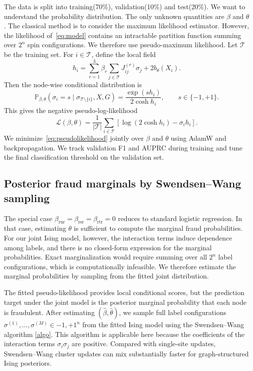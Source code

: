 \documentclass[twoside]{article}
\newcommand{\Pbb}{\mathbb P}
\newcommand{\Tcal}{\mathcal T}
\begin{document}
The data is split into training(70\%), validation(10\%) and test(20\%). We want to understand the probability distribution. The only unknown quantities are $\beta$ and $\theta$. The classical method is to consider the maximum likelihood estimator. However, the likelihood of~\eqref{eq:model} contains an intractable partition function summing over $2^n$ spin configurations. We therefore use pseudo-maximum likelihood. Let $\Tcal$ be the training set. For $i\in\Tcal$, define the local field
\begin{equation}
\label{eq:local-field}
    h_i = \sum_{r=1}^{3}\beta_r\sum_{j\in\Tcal}J_{ij}^{(r)}\sigma_j
    +2b_\theta(X_i).
\end{equation}
Then the node-wise conditional distribution is
\[
    \Pbb_{\beta,\theta}(\sigma_i=s\mid \sigma_{\Tcal\setminus\{i\}},X,G)
    =\frac{\exp(sh_i)}{2\cosh h_i},\qquad s\in\{-1,+1\}.
\]
This gives the negative pseudo-log-likelihood
\begin{equation}
\label{eq:pseudolikelihood}
    \mathcal L(\beta,\theta)
    =\frac{1}{|\Tcal|}\sum_{i\in\Tcal}\left[\log(2\cosh h_i)-\sigma_i h_i\right].
\end{equation}
We minimize~\eqref{eq:pseudolikelihood} jointly over $\beta$ and $\theta$ using AdamW and backpropagation. We track validation F1 and AUPRC during training and tune the final classification threshold on the validation set.

\subsection{Posterior fraud marginals by Swendsen--Wang sampling}

The special case $\beta_{\mathrm{rur}}=\beta_{\mathrm{rsr}}=\beta_{\mathrm{rtr}}=0$ reduces to standard logistic regression. In that case, estimating $\theta$ is sufficient to compute the marginal fraud probabilities. For our joint Ising model, however, the interaction terms induce dependence among labels, and there is no closed-form expression for the marginal probabilities. Exact marginalization would require summing over all $2^n$ label configurations, which is computationally infeasible. We therefore estimate the marginal probabilities by sampling from the fitted joint distribution.

The fitted pseudo-likelihood provides local conditional scores, but the prediction target under the joint model is the posterior marginal probability that each node is fraudulent. After estimating $(\widehat\beta,\widehat\theta)$, we sample full label configurations $\sigma^{(1)},\ldots,\sigma^{(M)}\in{-1,+1}^n$
from the fitted Ising model using the Swendsen--Wang algorithm \ref{algo}. This algorithm is applicable here because the coefficients of the interaction terms $\sigma_i\sigma_j$ are positive. Compared with single-site updates, Swendsen--Wang cluster updates can mix substantially faster for graph-structured Ising posteriors.
\end{document}
